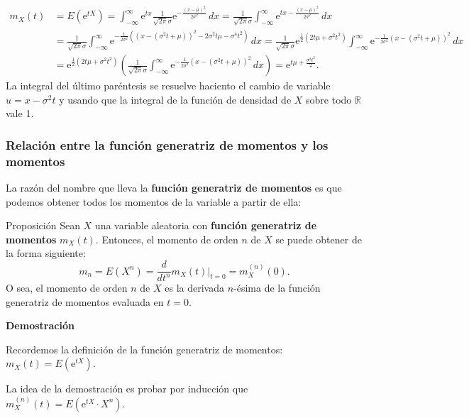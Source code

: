 \documentclass[]{book}
\begin{document}
\[
\begin{array}{rl}
m_X (t) & =E\left(\mathrm{e}^{tX}\right)=\int_{-\infty}^\infty \mathrm{e}^{tx}\frac{1}{\sqrt{2\pi}\sigma}\mathrm{e}^{-\frac{(x-\mu)^2}{2\sigma^2}}\, dx = \frac{1}{\sqrt{2\pi}\sigma} \int_{-\infty}^\infty \mathrm{e}^{tx-\frac{(x-\mu)^2}{2\sigma^2}}\, dx \\  & =  \frac{1}{\sqrt{2\pi}\sigma} \int_{-\infty}^\infty \mathrm{e}^{-\frac{1}{2\sigma^2}\left((x-(\sigma^2 t+\mu))^2-2\sigma^2 t \mu-\sigma^4t^2\right)}\, dx = \frac{1}{\sqrt{2\pi}\sigma} \mathrm{e}^{\frac{1}{2}(2 t \mu +\sigma^2 t^2)}\int_{-\infty}^\infty \mathrm{e}^{-\frac{1}{2\sigma^2}(x-(\sigma^2 t+\mu))^2}\, dx\\ &  = \mathrm{e}^{\frac{1}{2}(2 t \mu +\sigma^2 t^2)} \left( \frac{1}{\sqrt{2\pi}\sigma} \int_{-\infty}^\infty \mathrm{e}^{-\frac{1}{2\sigma^2}(x-(\sigma^2 t+\mu))^2}\, dx\right) =  \mathrm{e}^{ t \mu +\frac{\sigma^2 t^2}{2}}.
\end{array}
\]
La integral del último paréntesis se resuelve haciento el cambio de variable \(u=x-\sigma^2 t\) y usando que la integral de la función de densidad de \(X\) sobre todo \(\mathbb{R}\) vale 1.

\hypertarget{relaciuxf3n-entre-la-funciuxf3n-generatriz-de-momentos-y-los-momentos}{%
\subsubsection{Relación entre la función generatriz de momentos y los momentos}\label{relaciuxf3n-entre-la-funciuxf3n-generatriz-de-momentos-y-los-momentos}}

La razón del nombre que lleva la \textbf{función generatriz de momentos} es que podemos obtener todos los momentos de la variable a partir de ella:

 Proposición
Sean \(X\) una variable aleatoria con \textbf{función generatriz de momentos} \(m_X(t)\). Entonces, el momento de orden \(n\) de \(X\) se puede obtener de la forma siguiente:
\[
m_n =E\left(X^n\right)=\frac{d}{d t^n}m_X(t)|_{t=0} =m_X^{(n)}(0).
\]
O sea, el momento de orden \(n\) de \(X\) es la derivada \(n\)-ésima de la función generatriz de momentos evaluada en \(t=0\).

\textbf{Demostración}

Recordemos la definición de la función generatriz de momentos: \(m_X(t)=E\left(\mathrm{e}^{tX}\right).\)

La idea de la demostración es probar por inducción que \(m_X^{(n)}(t) =E\left(\mathrm{e}^{tX}\cdot X^n\right)\).
\end{document}
